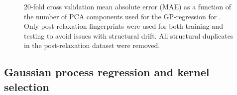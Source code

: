 

\begin{figure}[!htb]
\centering
{}
\caption{\label{fig:cv_anal}
20-fold cross validation mean absolute error (MAE) as a function of the number of PCA components used for the GP-regression for \IrOthree.
%
Only post-relaxation fingerprints were used for both training and testing to avoid issues with structural drift.
%
All structural duplicates in the post-relaxation dataset were removed.
}
\end{figure}


\subsection{Gaussian process regression and kernel selection}
%

